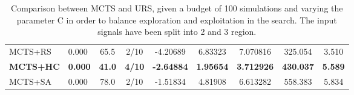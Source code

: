 \documentclass[11pt]{article}
\begin{document}
\begin{table}[ht]
\begin{tabular}{|l|l|c|c|c|c|c|c|c|}
MCTS+RS                                     & 0.000              &  65.5                   & 2/10                          & -4.20689  & 6.83323  & 7.070816 &  325.054 &  3.510    \\
\textbf{MCTS+HC}                                     & \textbf{0.000}              &  \textbf{41.0}                   & \textbf{4/10}                          & \textbf{-2.64884}  & \textbf{1.95654}  & \textbf{3.712926} &  \textbf{430.037} &  \textbf{5.589}    \\
MCTS+SA                                     & 0.000              &  78.0                   & 2/10                          & -1.51834  & 4.81908  & 6.613282 &  558.383 &  5.834    \\ \hline
\end{tabular}
\caption{Comparison between MCTS and URS, given a budget of 100 simulations and varying the parameter C in order to balance exploration and exploitation in the search. The input signals have been split into 2 and 3 region.}~\label{table:res:s1}
\end{table}
\end{document}
